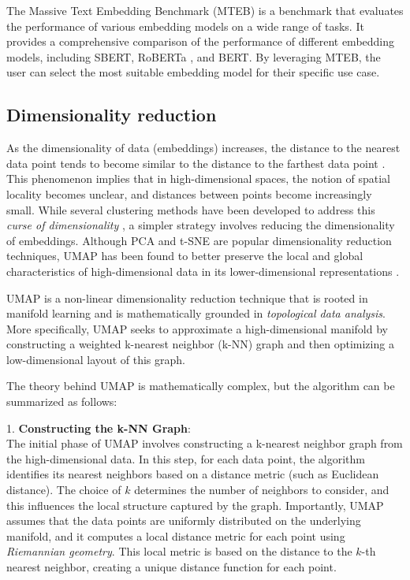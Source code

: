 The Massive Text Embedding Benchmark (MTEB) \cite{muennighoff_mteb_2023} is a benchmark that evaluates the performance of various embedding models on a wide range of tasks. It provides a comprehensive comparison of the performance of different embedding models, including SBERT, RoBERTa \cite{liu_roberta_2019}, and BERT. By leveraging MTEB, the user can select the most suitable embedding model for their specific use case.

\subsection{Dimensionality reduction}

As the dimensionality of data (embeddings) increases, the distance to the nearest data point tends to become similar to the distance to the farthest data point \cite{aggarwal_surprising_2001, beyer_when_1999}. This phenomenon implies that in high-dimensional spaces, the notion of spatial locality becomes unclear, and distances between points become increasingly small. While several clustering methods have been developed to address this \textit{curse of dimensionality} \cite{pandove_systematic_2018, steinbach_challenges_2004}, a simpler strategy involves reducing the dimensionality of embeddings. Although PCA \cite{abdi_principal_2010} and t-SNE \cite{van_der_maaten_visualizing_2008} are popular dimensionality reduction techniques, UMAP has been found to better preserve the local and global characteristics of high-dimensional data in its lower-dimensional representations \cite{mcinnes_umap_2020}.

UMAP is a non-linear dimensionality reduction technique that is rooted in manifold learning and is mathematically grounded in \textit{topological data analysis}. More specifically, UMAP seeks to approximate a high-dimensional manifold by constructing a weighted k-nearest neighbor (k-NN) graph and then optimizing a low-dimensional layout of this graph.

The theory behind UMAP is mathematically complex, but the algorithm can be summarized as follows:

1. \textbf{Constructing the k-NN Graph}:\\
The initial phase of UMAP involves constructing a k-nearest neighbor graph from the high-dimensional data. In this step, for each data point, the algorithm identifies its nearest neighbors based on a distance metric (such as Euclidean distance). The choice of $k$ determines the number of neighbors to consider, and this influences the local structure captured by the graph. Importantly, UMAP assumes that the data points are uniformly distributed on the underlying manifold, and it computes a local distance metric for each point using \textit{Riemannian geometry}. This local metric is based on the distance to the $k$-th nearest neighbor, creating a unique distance function for each point.

